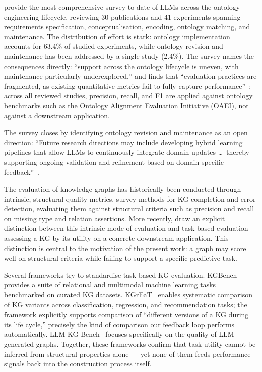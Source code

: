 \citet{li2025llmontologyreview} provide the most comprehensive survey to date of LLMs
across the ontology engineering lifecycle, reviewing 30 publications and 41 experiments
spanning requirements specification, conceptualisation, encoding, ontology matching, and
maintenance.
The distribution of effort is stark: ontology implementation accounts for 63.4\% of studied
experiments, while ontology revision and maintenance has been
addressed by a single study (2.4\%).
The survey names the consequences directly: ``support across the ontology lifecycle is
uneven, with maintenance particularly underexplored,'' and finds that ``evaluation practices
are fragmented, as existing quantitative metrics fail to fully capture
performance''~\citep{li2025llmontologyreview}; across all reviewed studies, precision,
recall, and F1 are applied against ontology benchmarks such as the Ontology Alignment
Evaluation Initiative (OAEI), not against a downstream application.

The survey closes by identifying ontology revision and maintenance as an open direction: 
``Future research directions may include developing hybrid learning
pipelines that allow LLMs to continuously integrate domain updates \ldots\ thereby supporting
ongoing validation and refinement based on domain-specific
feedback''~\citep{li2025llmontologyreview}.

The evaluation of knowledge graphs has historically been conducted through intrinsic,
structural quality metrics. \citet{paulheim2017kgquality} survey methods for KG completion
and error detection, evaluating them against structural criteria such as precision and recall
on missing type and relation assertions. More recently,
\citet{paulheim2024structuralquality} draw an explicit distinction between this intrinsic
mode of evaluation and task-based evaluation --- assessing a KG by its utility on
a concrete downstream application. This distinction is central to the motivation of the
present work: a graph may score well on structural criteria while failing to support a
specific predictive task.

Several frameworks try to standardise task-based KG evaluation. KGBench~\cite{bloem2021kgbench}
provides a suite of relational and multimodal machine learning tasks benchmarked on
curated KG datasets.
KGrEaT~\cite{heist2023kgreat} enables systematic comparison of KG variants across
classification, regression, and recommendation tasks; the framework explicitly supports
comparison of ``different versions of a KG during its life cycle,'' precisely the kind of
comparison our feedback loop performs automatically. LLM-KG-Bench~\cite{aksw2024llmkgbench}
focuses specifically on the quality of LLM-generated graphs. Together, these frameworks
confirm that task utility cannot be inferred from structural properties alone --- yet none
of them feeds performance signals back into the construction process itself.

